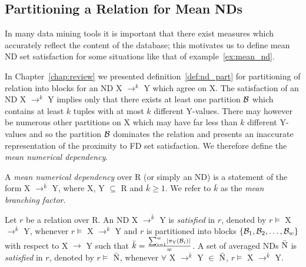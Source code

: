 \subsection{Partitioning a Relation for Mean NDs}\label{nd:subsec:mean}
In many data mining tools it is important that there exist measures
which accurately reflect the content of the database; this motivates
us to define mean ND set satisfaction for some situations like that of
example~\ref{ex:mean_nd}.

\smallskip

In Chapter~\ref{chap:review} we presented definition~\ref{def:nd_part}
for partitioning of relation into blocks for an ND X $\to^k$ Y which
agree on X.
The satisfaction of an ND X $\to^k$ Y implies only that there exists
at least one partition ${\cal B}$ which contains at least $k$ tuples
with at most $k$ different Y-values.  There may however be numerous
other partitions on X which may have far less than $k$ different
Y-values and so the partition ${\cal B}$ dominates the relation and
presents an inaccurate representation of the proximity to FD set
satisfaction.  We therefore define the {\em mean numerical dependency}.


\begin{definition}
\begin{rm}
A {\em mean numerical dependency} over R (or simply an ND)
is a statement of the form X $\to^{\bar{k}}$ Y, where X, Y $\subseteq$ R and
$\bar{k} \ge 1$. We refer to $\bar{k}$ as the {\em mean branching factor}.
\end{rm}
\end{definition}
 
\begin{definition}\label{def:sat-mean_nd}
\begin{rm}
Let $r$ be a relation over R.
An ND X $\to^{\bar{k}}$ Y is {\em satisfied} in $r$,
denoted by $r \models$ X $\to^{\bar{k}}$ Y, whenever
$r \models$ X $\to^k$ Y and $r$ is partitioned into blocks
$\{{\cal B}_1, {\cal B}_2, \ldots, {\cal B}_w\}$ with respect to X
$\to$ Y such that $\bar{k} = \frac{\sum_{i = 1}^{w} \mid
\pi_{\rm Y}({\cal B}_{i}) \mid }{w}$.
A set of averaged NDs $\bar{\rm N}$ is {\em satisfied} in $r$,
denoted by $r \models$ $\bar{\rm N}$, whenever
$\forall$ X $\to^{\bar{k}}$ Y $\in$ $\bar{\rm N}$, $r \models$ X $\to^{\bar{k}}$ Y.
\end{rm}
\end{definition}



